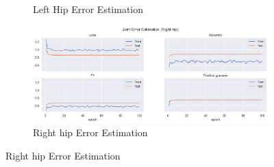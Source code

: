 \begin{figure}[!ht]
\begin{subfigure}[b]{0.47\linewidth}
        \caption{Left Hip Error Estimation}
        \label{fig:v2_lehi_jt_ee}
    \end{subfigure}
    \hfill
    \begin{subfigure}[b]{0.47\linewidth}
        \centering
        \includegraphics[width=\textwidth]{figures/Results/v2_bs_40_is_64_e_100/jt/Right hip_ErrorEstimation.png}
        \caption{Right hip Error Estimation}
        \label{fig:v2_rihi_jt_ee}
    \end{subfigure}
  \end{figure}
  
